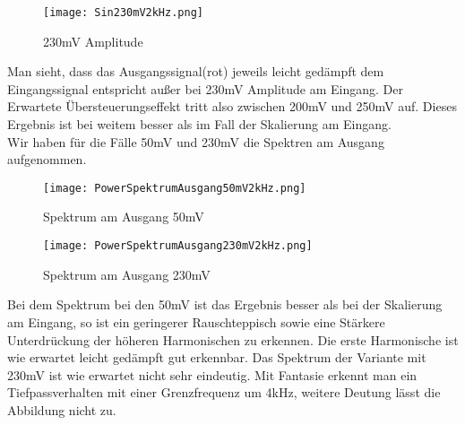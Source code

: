 \begin{figure}[H]
  \centering
    \texttt{[image: Sin230mV2kHz.png]}
  \caption{230mV Amplitude}
  \label{fig:Sin230mV2kHz}
\end{figure}
Man sieht, dass das Ausgangssignal(rot) jeweils leicht gedämpft dem Eingangssignal entspricht außer bei 230mV Amplitude am Eingang. Der Erwartete Übersteuerungseffekt tritt also zwischen 200mV und 250mV auf. Dieses Ergebnis ist bei weitem besser als im Fall der Skalierung am Eingang.\\
Wir haben für die Fälle 50mV und 230mV die Spektren am Ausgang aufgenommen.\\
\begin{figure}[H]
  \centering
    \texttt{[image: PowerSpektrumAusgang50mV2kHz.png]}
  \caption{Spektrum am Ausgang 50mV}
  \label{fig:PowerSpektrumAusgang50mV2kHz}
\end{figure}
\begin{figure}[H]
  \centering
    \texttt{[image: PowerSpektrumAusgang230mV2kHz.png]}
  \caption{Spektrum am Ausgang 230mV}
  \label{fig:PowerSpektrumAusgang230mV2kHz}
\end{figure}
Bei dem Spektrum bei den 50mV ist das Ergebnis besser als bei der Skalierung am Eingang, so ist ein geringerer Rauschteppisch sowie eine Stärkere Unterdrückung der höheren Harmonischen zu erkennen. Die erste Harmonische ist wie erwartet leicht gedämpft gut erkennbar. Das Spektrum der Variante mit 230mV ist wie erwartet nicht sehr eindeutig. Mit Fantasie erkennt man ein Tiefpassverhalten mit einer Grenzfrequenz um 4kHz, weitere Deutung lässt die Abbildung nicht zu.

